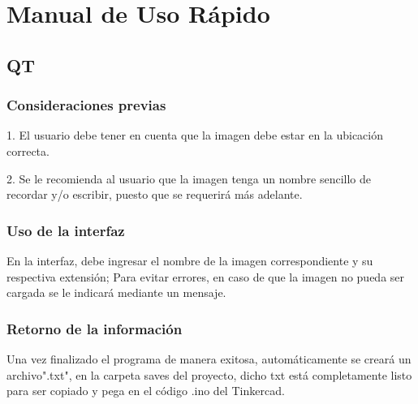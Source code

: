 \documentclass{article}
\begin{document}
   \newpage
    
\section{Manual de Uso Rápido}
\label{manual}
    \begin{flushleft}
    \subsection{QT}
    \end{flushleft}
    \begin{flushleft}
    \subsubsection{Consideraciones previas}
    1. El usuario debe tener en cuenta que la imagen debe estar en la ubicación correcta.
    
    \vspace{0.1cm}
    
    2. Se le recomienda al usuario que la imagen tenga un nombre sencillo de recordar y/o escribir, puesto que se requerirá más adelante.
    \end{flushleft}
    
    \begin{flushleft}
    \subsubsection{Uso de la interfaz}
    En la interfaz, debe ingresar el nombre de la imagen correspondiente y su respectiva extensión; Para evitar errores, en caso de que la imagen no pueda ser cargada se le indicará mediante un mensaje. 
    \end{flushleft}
    \begin{flushleft}
    \subsubsection{Retorno de la información}
    Una vez finalizado el programa de manera exitosa, automáticamente se creará un archivo".txt", en la carpeta saves del proyecto, dicho txt está completamente listo para ser copiado y pega en el código .ino del Tinkercad.  
    \end{flushleft}
    
\end{document}
